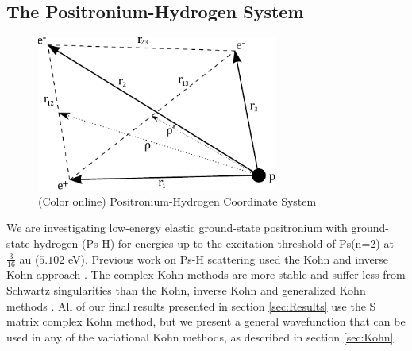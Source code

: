 \documentclass[preprint,showpacs,preprintnumbers,amsmath,amssymb]{revtex4}
\begin{document}
\subsection{The Positronium-Hydrogen System}
\begin{figure}[!h]
	\centering
	\includegraphics[height=2in]{PsHCoordinates}
	\caption{(Color online) Positronium-Hydrogen Coordinate System}
	\label{fig:PsHCoords}
\end{figure}

We are investigating low-energy elastic ground-state positronium with ground-state hydrogen (Ps-H) for energies up to the excitation threshold of Ps(n=2) at $\tfrac{3}{16}$ au ($5.102$ eV). Previous work on Ps-H scattering used the Kohn and inverse Kohn approach \cite{VanReeth2003, VanReeth2004}. The complex Kohn methods are more stable and suffer less from Schwartz singularities than the Kohn, inverse Kohn and generalized Kohn methods \cite{Cooper2010}. All of our final results presented in section \ref{sec:Results} use the S matrix complex Kohn method, but we present a general wavefunction that can be used in any of the variational Kohn methods, as described in section \ref{sec:Kohn}.
\end{document}
